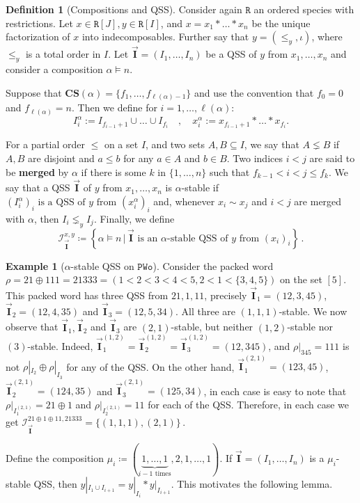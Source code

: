 \documentclass[submission]{FPSAC2023}
\theoremstyle{definition}
\newtheorem{defin}[thm]{Definition}
\newtheorem{smpl}[thm]{Example}
\newcommand{\III}{\vec{\mathbf{I}}}
\begin{document}
\begin{defin}[Compositions and QSS]
Consider again $\mathtt{R}$ an ordered species with restrictions.
Let $x \in \mathtt{R}[J], y \in  \mathtt{R}[I]$, and $x = x_1\ast \dots \ast x_n$ be the unique factorization of $x$ into indecomposables.
Further say that $y = (\leq_y, \iota)$, where $\leq_y$ is a total order in $I$.
Let $\III = (I_1, \dots , I_n)$ be a QSS of $y$ from $x_1, \dots, x_n$ and consider a composition $\alpha \models n$.


Suppose that $ \mathbf{CS} (\alpha) = \{f_1, \dots, f_{\ell(\alpha) - 1} \}$ and use the convention that $f_0 = 0$ and $f_{\ell(\alpha)} = n$. 
Then we define for $i = 1, \dots, \ell(\alpha)$:
\[I^{\alpha}_i := I_{f_{i-1} + 1} \cup \dots \cup I_{f_i} \quad , \quad x^{\alpha}_i := x_{f_{i-1} + 1} \ast \dots \ast x_{f_i}.\]


For a partial order $\leq$ on a set $I$, and two sets $A, B \subseteq I$, we say that $A \lneq B$ if $A, B$ are disjoint and $a \leq b$ for any $a \in A$ and $b \in B$. Two indices $i< j$ are said to be \textbf{merged} by $\alpha$ if there is some $k$ in $\{1, \dots, n\}$ such that $ f_{k-1} < i < j \leq f_k$.
We say that a QSS $\III$ of $y$ from $x_1, \dots , x_n$ is $\alpha $-stable if $(I^{\alpha}_i)_i \text{ is a QSS of $y$ from } (x^{\alpha}_i)_i$ and, whenever $x_i \sim x_j$ and $i < j$ are merged with $\alpha $, then $I_i \lneq_y I_j$. Finally, we define 
\begin{equation}
   \mathcal I^{x, y}_{\III} \coloneqq \left\{ \alpha \models n \,\Big| \,\III \text{ is an $\alpha$-stable QSS of $y$ from } (x_i)_i \right\} \, . 
\end{equation}
\end{defin}

\begin{smpl}[$\alpha$-stable QSS on $\mathtt{PWo}$]
Consider the packed word $\rho = 21 \oplus 111 = 21333 = (1 < 2 < 3 < 4 < 5, 2 < 1 < \{3, 4, 5\})$ on the set $[5]$.
This packed word has three QSS from $21, 1, 11$, precisely $\III_1 =(12, 3, 45)$, $\III_2 =(12, 4, 35)$ and $\III_3 =(12, 5, 34)$.
All three are $(1, 1, 1)$-stable. We now observe that $\III_1, \III_2$ and $\III_3$ are $(2, 1)$-stable, but neither $(1, 2)$-stable nor $(3)$-stable.
Indeed, $\III_1^{(1, 2)} = \III_2^{(1, 2)} = \III_3^{(1, 2)} = (12, 345)$, and $\rho|_{345} = 111$ is not $\rho|_{I_2} \oplus \rho|_{I_3}$ for any of the QSS.
On the other hand, $\III_1^{(2, 1)} = (123, 45)$, $\III_2^{(2, 1)} = (124, 35)$ and $\III_3^{(2, 1)} = (125, 34)$, in each case is easy to note that $\rho|_{I_1^{(2, 1)}} = 21\oplus 1$ and $\rho|_{I_2^{(2, 1)}} = 11$ for each of the QSS. Therefore, in each case we get
$\mathcal I_{\III}^{21\oplus 1\oplus 11, 21333} = \{(1, 1, 1), (2, 1)\}\, $.
\end{smpl}
Define the composition $\mu_i \coloneqq (\underbrace{1, \dots , 1}_\text{$i-1$ times}, 2, 1, \dots, 1)$.
If $\III = (I_1, \dots, I_n)$  is a $\mu_i$-stable QSS, then $y|_{I_1 \cup I_{i+1}} = y|_{I_i} \ast y|_{I_{i+1}}$.
This motivates the following lemma.
\end{document}

